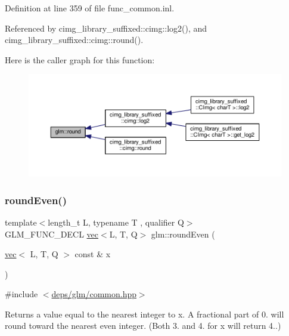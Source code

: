 Definition at line 359 of file func\+\_\+common.\+inl.



Referenced by cimg\+\_\+library\+\_\+suffixed\+::cimg\+::log2(), and cimg\+\_\+library\+\_\+suffixed\+::cimg\+::round().

Here is the caller graph for this function\+:
\nopagebreak
\begin{figure}[H]
\begin{center}
\leavevmode
\includegraphics[width=350pt]{d0/de3/group__core__func__common_gafa03aca8c4713e1cc892aa92ca135a7e_icgraph}
\end{center}
\end{figure}
\mbox{\label{group__core__func__common_ga76b81785045a057989a84d99aeeb1578}} 
\subsubsection{\texorpdfstring{round\+Even()}{roundEven()}}
{\footnotesize\ttfamily template$<$length\+\_\+t L, typename T , qualifier Q$>$ \\
G\+L\+M\+\_\+\+F\+U\+N\+C\+\_\+\+D\+E\+CL \hyperlink{structglm_1_1vec}{vec}$<$L, T, Q$>$ glm\+::round\+Even (\begin{DoxyParamCaption}\item[{\hyperlink{structglm_1_1vec}{vec}$<$ L, T, Q $>$ const \&}]{x }\end{DoxyParamCaption})}



{\ttfamily \#include $<$\hyperlink{common_8hpp}{deps/glm/common.\+hpp}$>$}

Returns a value equal to the nearest integer to x. A fractional part of 0. will round toward the nearest even integer. (Both 3. and 4. for x will return 4..)


